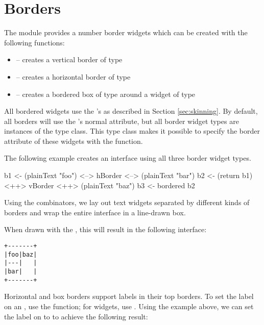 \section{Borders}
\label{sec:borders}

The  module provides a number border widgets which can be
created with the following functions:

\begin{itemize}
\item {} -- creates a vertical border of type 
\item {} -- creates a horizontal border of type 
\item {} -- creates a bordered box of type  around a widget of type 
\end{itemize}

All bordered widgets use the 's  as
described in Section \ref{sec:skinning}.  By default, all borders will
use the 's normal attribute, but all border widget
types are instances of the  type class.  This type
class makes it possible to specify the border attribute of these
widgets with the  function.

The following example creates an interface using all three border
widget types.

\begin{haskellcode}
 b1 <- (plainText "foo") <--> hBorder <--> (plainText "bar")
 b2 <- (return b1) <++> vBorder <++> (plainText "baz")
 b3 <- bordered b2
\end{haskellcode}

Using the  combinators, we lay out text widgets separated by
different kinds of borders and wrap the entire interface in a
line-drawn box.

When drawn with the , this will result in the following
interface:

\begin{verbatim}
+-------+
|foo|baz|
|---|   |
|bar|   |
+-------+
\end{verbatim}

Horizontal and box borders support labels in their top borders.  To
set the label on an , use the 
function; for  widgets, use .  Using
the example above, we can set the label on  to  to
achieve the following result:

